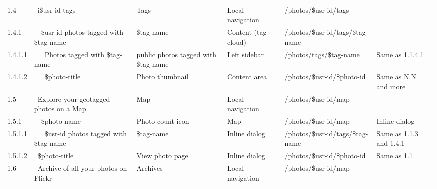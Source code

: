 \documentclass[12pt,a4paper]{article}
\begin{document}
\begin{landscape}
\begin{table}[h!b!p!]
\begin{center}
\begin{tiny}
\begin{tabular}{l|l|l|l|l|p{3cm}}
              1.4 &
              ~i\$usr-id tags &
              Tags &
              Local navigation &
              /photos/\$usr-id/tags &
              \\

                1.4.1 &
                ~~\$usr-id photos tagged with \$tag-name &
                \$tag-name &
                Content (tag cloud) &
                /photos/\$usr-id/tags/\$tag-name &
                \\

                  1.4.1.1 &
                  ~~~Photos tagged with \$tag-name &
                  public photos tagged with \$tag-name &
                  Left sidebar &
                  /photos/tags/\$tag-name &
                  Same as 1.1.4.1 \\

                  1.4.1.2 &
                  ~~~\$photo-title &
                  Photo thumbnail &
                  Content area &
                  /photos/\$usr-id/\$photo-id &
                  Same as N.N and more\\

              1.5 &
              ~Explore your geotagged photos on a Map &
              Map &
              Local navigation &
              /photos/\$usr-id/map &
              \\

                1.5.1 &
                ~~\$photo-name &
                Photo count icon &
                Map &
                /photos/\$usr-id/map &
                Inline dialog\\

                  1.5.1.1 &
                  ~~~\$usr-id photos tagged with \$tag-name &
                  \$tag-name &
                  Inline dialog &
                  /photos/\$usr-id/tags/\$tag-name &
                  Same as 1.1.3 and 1.4.1\\

                  1.5.1.2 &
                  ~\$photo-title &
                  View photo page &
                  Inline dialog &
                  /photos/\$usr-id/\$photo-id &
                  Same as 1.1 \\

              1.6 &
              ~Archive of all your photos on Flickr &
              Archives &
              Local navigation &
              /photos/\$usr-id/map &
              \\


\end{tabular}
\end{tiny}
\end{center}
\end{table}
\end{landscape}
\end{document}
